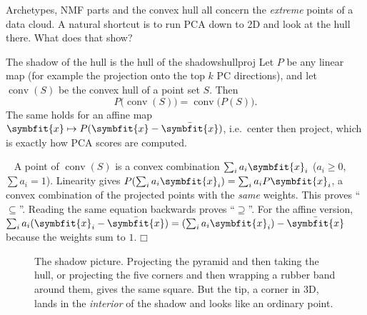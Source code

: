 \documentclass[11pt]{article}
\newcommand{\bm}[1]{\symbfit{#1}}
\newenvironment{proofsketch}{\par\noindent{\itshape Proof.}\ }{\hfill$\mdlgwhtsquare$\par}
\newcommand{\vx}{\bm{x}}
\newcommand{\xbar}{\bar{\bm{x}}}
\begin{document}
Archetypes, NMF parts and the convex hull all concern the \emph{extreme} points of a data
cloud. A natural shortcut is to run PCA down to 2D and look at the hull there. What does that show?

\begin{proposition}{The shadow of the hull is the hull of the shadows}{hullproj}
Let $P$ be any linear map (for example the projection onto the top $k$ PC directions), and let
$\operatorname{conv}(S)$ be the convex hull of a point set $S$. Then
\[
P\big(\operatorname{conv}(S)\big)=\operatorname{conv}\big(P(S)\big).
\]
The same holds for an affine map $\vx\mapsto P(\vx-\xbar)$, i.e.\ center then project, which is exactly
how PCA scores are computed.
\end{proposition}
\begin{proofsketch}
A point of $\operatorname{conv}(S)$ is a convex combination $\sum_i a_i\vx_i$ ($a_i\ge0$, $\sum a_i=1$). Linearity
gives $P(\sum_ia_i\vx_i)=\sum_ia_iP\vx_i$, a convex combination of the projected points with the
\emph{same} weights. This proves ``$\subseteq$''. Reading the same equation backwards proves ``$\supseteq$''.
For the affine version, $\sum_ia_i(\vx_i-\xbar)=(\sum_ia_i\vx_i)-\xbar$ because the weights sum to $1$.
\end{proofsketch}

\begin{figure}[htbp]
\centering
{}
\caption{The shadow picture. Projecting the pyramid and then taking the hull, or projecting the five
corners and then wrapping a rubber band around them, gives the same square. But the tip, a corner
in 3D, lands in the \emph{interior} of the shadow and looks like an ordinary point.}
\end{figure}
\end{document}
